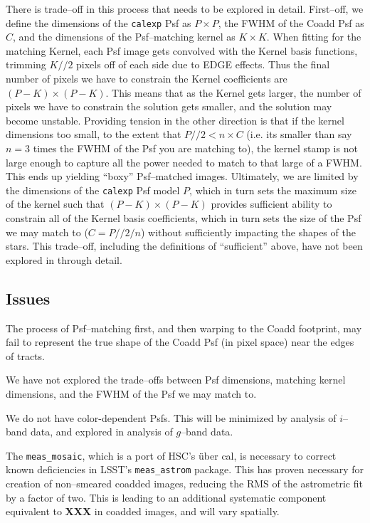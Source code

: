 \documentclass[12pt]{article}
\begin{document}
There is trade--off in this process that needs to be explored in
detail.  First--off, we define the dimensions of the {\tt calexp} Psf
as $P \times P$, the FWHM of the Coadd Psf as $C$, and the dimensions
of the Psf--matching kernel as $K \times K$.  When fitting for the
matching Kernel, each Psf image gets convolved with the Kernel basis
functions, trimming $K//2$ pixels off of each side due to EDGE
effects.  Thus the final number of pixels we have to constrain the
Kernel coefficients are $(P-K) \times (P-K)$.  This means that as the
Kernel gets larger, the number of pixels we have to constrain the
solution gets smaller, and the solution may become unstable.
Providing tension in the other direction is that if the kernel
dimensions too small, to the extent that $P//2 < n \times C$ (i.e. its
smaller than say $n=3$ times the FWHM of the Psf you are matching to),
the kernel stamp is not large enough to capture all the power needed
to match to that large of a FWHM.  This ends up yielding ``boxy''
Psf--matched images.  Ultimately, we are limited by the dimensions of
the {\tt calexp} Psf model $P$, which in turn sets the maximum size of
the kernel such that $(P-K) \times (P-K)$ provides sufficient ability
to constrain all of the Kernel basis coefficients, which in turn sets
the size of the Psf we may match to ($C = P//2 / n$) without
sufficiently impacting the shapes of the stars.  This trade--off,
including the definitions of ``sufficient'' above, have not been
explored in through detail.

\subsection{Issues}

The process of Psf--matching first, and then warping to the Coadd
footprint, may fail to represent the true shape of the Coadd Psf (in
pixel space) near the edges of tracts.

We have not explored the trade--offs between Psf dimensions, matching
kernel dimensions, and the FWHM of the Psf we may match to.

We do not have color-dependent Psfs.  This will be minimized by
analysis of $i$--band data, and explored in analysis of $g$--band
data.

The {\tt meas\_mosaic}, which is a port of HSC's \"{u}ber cal, is
necessary to correct known deficiencies in LSST's {\tt meas\_astrom}
package.  This has proven necessary for creation of non--smeared
coadded images, reducing the RMS of the astrometric fit by a factor of
two.  This is leading to an additional systematic component equivalent
to {\bf XXX} in coadded images, and will vary spatially.
\end{document}
